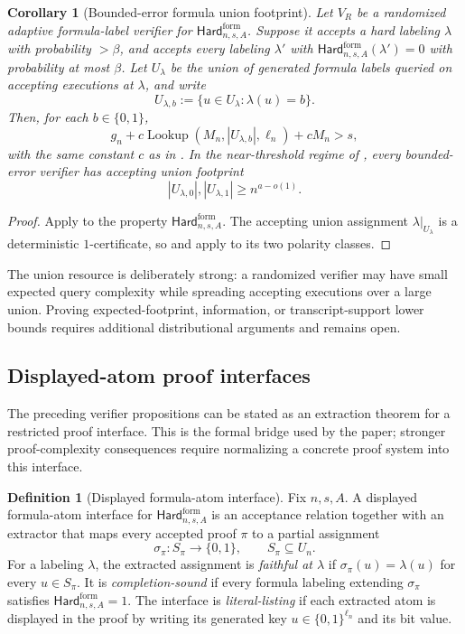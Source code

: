 \documentclass[11pt]{article}
\newtheorem{corollary}[theorem]{Corollary}
\theoremstyle{definition}
\newtheorem{definition}[theorem]{Definition}
\newcommand{\bits}{\{0,1\}}
\newcommand{\Lookup}{\operatorname{Lookup}}
\newcommand{\HardF}{\mathsf{Hard}^{\mathrm{form}}}
\begin{document}
\begin{corollary}[Bounded-error formula union footprint]\label{cor:randomized-formula-union}
Let \(V_R\) be a randomized adaptive formula-label verifier for \(\HardF_{n,s,A}\).  Suppose it accepts a hard labeling \(\lambda\) with probability \(>\beta\), and accepts every labeling \(\lambda'\) with \(\HardF_{n,s,A}(\lambda')=0\) with probability at most \(\beta\).  Let \(U_\lambda\) be the union of generated formula labels queried on accepting executions at \(\lambda\), and write
\[
  U_{\lambda,b}:=\{u\in U_\lambda:\lambda(u)=b\}.
\]
Then, for each \(b\in\bits\),
\[
  g_n+c\Lookup(M_n,|U_{\lambda,b}|,\ell_n)+cM_n>s,
\]
with the same constant \(c\) as in .  In the near-threshold regime of , every bounded-error verifier has accepting union footprint
\[
  |U_{\lambda,0}|,|U_{\lambda,1}|\ge n^{a-o(1)}.
\]
\end{corollary}

\begin{proof}
Apply  to the property \(\HardF_{n,s,A}\).  The accepting union assignment \(\lambda|_{U_\lambda}\) is a deterministic \(1\)-certificate, so  and  apply to its two polarity classes.
\end{proof}

The union resource is deliberately strong: a randomized verifier may have small expected query complexity while spreading accepting executions over a large union.  Proving expected-footprint, information, or transcript-support lower bounds requires additional distributional arguments and remains open.

\subsection{Displayed-atom proof interfaces}

The preceding verifier propositions can be stated as an extraction theorem for a restricted proof interface.  This is the formal bridge used by the paper; stronger proof-complexity consequences require normalizing a concrete proof system into this interface.

\begin{definition}[Displayed formula-atom interface]\label{def:displayed-atom-interface}
Fix \(n,s,A\).  A displayed formula-atom interface for \(\HardF_{n,s,A}\) is an acceptance relation together with an extractor that maps every accepted proof \(\pi\) to a partial assignment
\[
  \sigma_\pi:S_\pi\to\bits,
  \qquad S_\pi\subseteq U_n.
\]
For a labeling \(\lambda\), the extracted assignment is \emph{faithful at \(\lambda\)} if \(\sigma_\pi(u)=\lambda(u)\) for every \(u\in S_\pi\).  It is \emph{completion-sound} if every formula labeling extending \(\sigma_\pi\) satisfies \(\HardF_{n,s,A}=1\).  The interface is \emph{literal-listing} if each extracted atom is displayed in the proof by writing its generated key \(u\in\bits^{\ell_n}\) and its bit value.
\end{definition}
\end{document}
